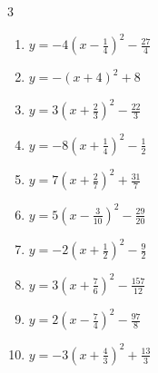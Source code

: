 \begin{multicols}{3}
\begin{enumerate}

  \item $\displaystyle y=-4\left( x-\frac{1}{4}\right)^{2}-\frac{27}{4}$


  \item $\displaystyle y=-\left( x+4\right)^{2}+8$

        \phantom{$\displaystyle 頂点\left( -4 , 8 \right)$}

  \item $\displaystyle y=3\left( x+\frac{2}{3}\right)^{2}-\frac{22}{3}$


  \item $\displaystyle y=-8\left( x+\frac{1}{4}\right)^{2}-\frac{1}{2}$


  \item $\displaystyle y=7\left( x+\frac{2}{7}\right)^{2}+\frac{31}{7}$


  \item $\displaystyle y=5\left( x-\frac{3}{10}\right)^{2}-\frac{29}{20}$


  \item $\displaystyle y=-2\left( x+\frac{1}{2}\right)^{2}-\frac{9}{2}$


  \item $\displaystyle y=3\left( x+\frac{7}{6}\right)^{2}-\frac{157}{12}$


  \item $\displaystyle y=2\left( x-\frac{7}{4}\right)^{2}-\frac{97}{8}$


  \item $\displaystyle y=-3\left( x+\frac{4}{3}\right)^{2}+\frac{13}{3}$


\end{enumerate}
\end{multicols}
